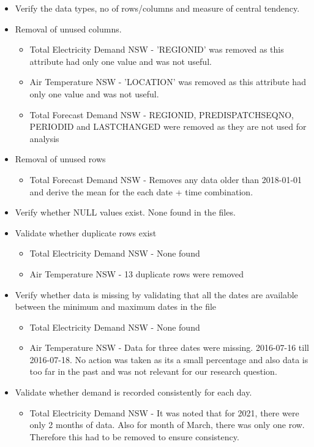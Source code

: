 \documentclass[mstat,12pt]{unswthesis}
\begin{document}
\begin{itemize}
  \item Verify the data types, no of rows/columns and measure of central tendency.
  \item Removal of unused columns. 
    \begin{itemize}
      \item Total Electricity Demand NSW - 'REGIONID' was removed as this attribute had only one value and was not useful.
      \item Air Temperature NSW - 'LOCATION' was removed as this attribute had only one value and was not useful.
      \item Total Forecast Demand NSW - REGIONID, PREDISPATCHSEQNO, PERIODID and LASTCHANGED were removed as they are not used for analysis
    \end{itemize}
  \item Removal of unused rows
    \begin{itemize}
    \item Total Forecast Demand NSW - Removes any data older than 2018-01-01 and derive the mean for the each date + time combination.
    \end{itemize}
  \item Verify whether NULL values exist. None found in the files.
  \item Validate whether duplicate rows exist
    \begin{itemize}
      \item Total Electricity Demand NSW - None found
      \item Air Temperature NSW - 13 duplicate rows were removed
    \end{itemize}
  \item Verify whether data is missing by validating that all the dates are available between the minimum and maximum dates in the file
    \begin{itemize}
      \item Total Electricity Demand NSW - None found
      \item Air Temperature NSW - Data for three dates were missing. 2016-07-16 till 2016-07-18. No action was taken as its a small percentage and also data is too far in the past and was not relevant for our research question.
    \end{itemize}
  \item Validate whether demand is recorded consistently for each day. 
    \begin{itemize}
      \item Total Electricity Demand NSW - It was noted that for 2021, there were only 2 months of data. Also for month of March, there was only one row. Therefore this had to be removed to ensure consistency.

\end{itemize}
\end{itemize}
\end{document}
